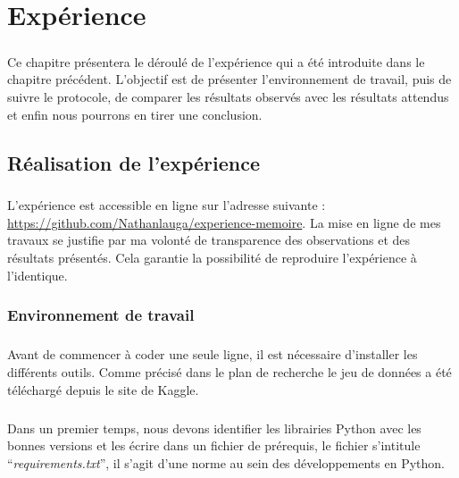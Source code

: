 \documentclass[10pt, french, a4paper]{report}
\begin{document}
\newpage
\chapter{Expérience}

\paragraph{}
Ce chapitre présentera le déroulé de l'expérience qui a été introduite dans le chapitre précédent. L'objectif est de présenter l'environnement de travail, puis de suivre le protocole, de comparer les résultats observés avec les résultats attendus et enfin nous pourrons en tirer une conclusion.

\section{Réalisation de l'expérience}

\paragraph{}
L'expérience est accessible en ligne sur l'adresse suivante : \href{https://github.com/Nathanlauga/experience-memoire}{https://github.com/Nathanlauga/experience-memoire}. La mise en ligne de mes travaux se justifie par ma volonté de transparence des observations et des résultats présentés. Cela garantie la possibilité de reproduire l'expérience à l'identique. 

\subsection{Environnement de travail}

\paragraph{}
Avant de commencer à coder une seule ligne, il est nécessaire d'installer les différents outils. Comme précisé dans le plan de recherche le jeu de données a été téléchargé depuis le site de Kaggle.

\paragraph{}
Dans un premier temps, nous devons identifier les librairies Python avec les bonnes versions et les écrire dans un fichier de prérequis, le fichier s'intitule ``\textit{requirements.txt}'', il s'agit d'une norme au sein des développements en Python. 
\end{document}
